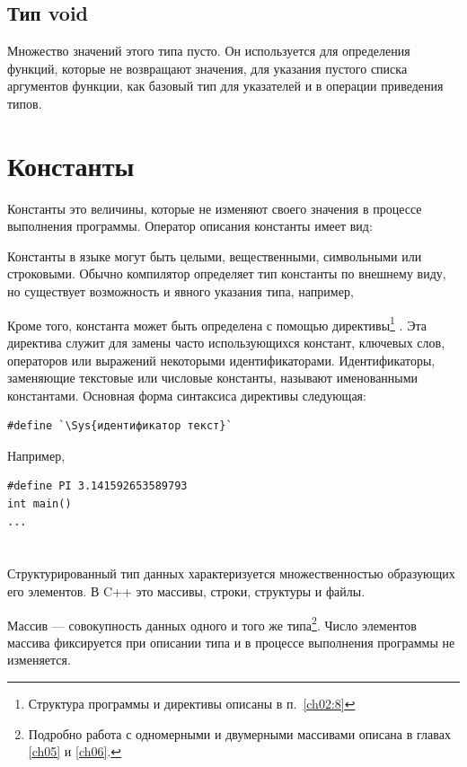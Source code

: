 \subsection[Тип void]{Тип void}
Множество значений этого типа пусто. Он используется для определения функций, которые не возвращают значения, для
указания пустого списка аргументов функции, как базовый тип для указателей и в операции приведения типов.

\section[Константы]{Константы}
Константы это величины, которые не изменяют своего значения в процессе выполнения
программы. Оператор описания константы имеет вид:


Константы в языке  могут быть целыми, вещественными, символьными или строковыми. Обычно компилятор определяет тип
константы по внешнему виду, но существует возможность и явного указания типа, например,


Кроме того, константа может быть определена с помощью директивы\footnote{Структура программы и директивы описаны в
п.~\ref{ch02:8}}
. Эта директива служит для замены часто использующихся констант, ключевых слов,
операторов или выражений некоторыми идентификаторами. Идентификаторы, заменяющие текстовые или числовые константы,
называют {именованными константами}. Основная форма синтаксиса директивы следующая:
\begin{lstlisting}
#define `\Sys{идентификатор текст}`
\end{lstlisting}
Например, 
\begin{lstlisting}
#define PI 3.141592653589793
int main()
...
\end{lstlisting}

\section[Структурированные типы данных]{}
Структурированный тип данных характеризуется множественностью
образующих его элементов. В C++ это массивы, строки, структуры и файлы.

Массив --- совокупность данных одного и того же типа\footnote{Подробно работа с
одномерными и двумерными массивами описана в главах \ref{ch05} и \ref{ch06}.}. Число элементов массива 
фиксируется при описании типа и в
процессе выполнения программы не изменяется.

